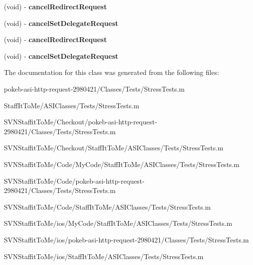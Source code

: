 \begin{DoxyCompactItemize}
\item 
\hypertarget{interface_stress_tests_07_08_a4670f6c57144f2cb491100fa08a371ce}{
(void) -\/ {\bfseries cancel\-Redirect\-Request}}
\label{interface_stress_tests_07_08_a4670f6c57144f2cb491100fa08a371ce}

\item 
\hypertarget{interface_stress_tests_07_08_a3831437968ca1cbf2a0c01fdd57e05f6}{
(void) -\/ {\bfseries cancel\-Set\-Delegate\-Request}}
\label{interface_stress_tests_07_08_a3831437968ca1cbf2a0c01fdd57e05f6}

\item 
\hypertarget{interface_stress_tests_07_08_a4670f6c57144f2cb491100fa08a371ce}{
(void) -\/ {\bfseries cancel\-Redirect\-Request}}
\label{interface_stress_tests_07_08_a4670f6c57144f2cb491100fa08a371ce}

\item 
\hypertarget{interface_stress_tests_07_08_a3831437968ca1cbf2a0c01fdd57e05f6}{
(void) -\/ {\bfseries cancel\-Set\-Delegate\-Request}}
\label{interface_stress_tests_07_08_a3831437968ca1cbf2a0c01fdd57e05f6}

\end{DoxyCompactItemize}


\-The documentation for this class was generated from the following files\-:\begin{DoxyCompactItemize}
\item 
pokeb-\/asi-\/http-\/request-\/2980421/\-Classes/\-Tests/\-Stress\-Tests.\-m\item 
\-Staff\-It\-To\-Me/\-A\-S\-I\-Classes/\-Tests/\-Stress\-Tests.\-m\item 
\-S\-V\-N\-Staffit\-To\-Me/\-Checkout/pokeb-\/asi-\/http-\/request-\/2980421/\-Classes/\-Tests/\-Stress\-Tests.\-m\item 
\-S\-V\-N\-Staffit\-To\-Me/\-Checkout/\-Staff\-It\-To\-Me/\-A\-S\-I\-Classes/\-Tests/\-Stress\-Tests.\-m\item 
\-S\-V\-N\-Staffit\-To\-Me/\-Code/\-My\-Code/\-Staff\-It\-To\-Me/\-A\-S\-I\-Classes/\-Tests/\-Stress\-Tests.\-m\item 
\-S\-V\-N\-Staffit\-To\-Me/\-Code/pokeb-\/asi-\/http-\/request-\/2980421/\-Classes/\-Tests/\-Stress\-Tests.\-m\item 
\-S\-V\-N\-Staffit\-To\-Me/\-Code/\-Staff\-It\-To\-Me/\-A\-S\-I\-Classes/\-Tests/\-Stress\-Tests.\-m\item 
\-S\-V\-N\-Staffit\-To\-Me/ios/\-My\-Code/\-Staff\-It\-To\-Me/\-A\-S\-I\-Classes/\-Tests/\-Stress\-Tests.\-m\item 
\-S\-V\-N\-Staffit\-To\-Me/ios/pokeb-\/asi-\/http-\/request-\/2980421/\-Classes/\-Tests/\-Stress\-Tests.\-m\item 
\-S\-V\-N\-Staffit\-To\-Me/ios/\-Staff\-It\-To\-Me/\-A\-S\-I\-Classes/\-Tests/\-Stress\-Tests.\-m\end{DoxyCompactItemize}
